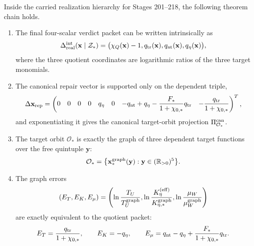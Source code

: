 \begin{theorem}
\label{thm:app-part06-main}
Inside the carried realization hierarchy for Stages 201--218, the following theorem chain holds.
\begin{enumerate}[leftmargin=2.2em]
  \item The final four-scalar verdict packet can be written intrinsically as
  \begin{equation}
  \label{eq:app-part06-main-intrinsic-packet}
  \Delta_{\rm real}^{\rm int}(\mathbf x\mid\mathcal Z_*)
  =
  \bigl(
  \chi_Q(\mathbf x)-1,
  q_{\rm tr}(\mathbf x),
  q_{\rm nt}(\mathbf x),
  q_\eta(\mathbf x)
  \bigr),
  \end{equation}
  where the three quotient coordinates are logarithmic ratios of the three target monomials.
  \item The canonical repair vector is supported only on the dependent triple,
  \begin{equation}
  \label{eq:app-part06-main-repair-vector}
  \Delta\mathbf x_{\rm rep}=
  \begin{pmatrix}
  0&0&0&0&q_\eta&0&-q_{\rm nt}+q_\eta-\dfrac{F_*}{1+\chi_{0,*}}q_{\rm tr}&-\dfrac{q_{\rm tr}}{1+\chi_{0,*}}
  \end{pmatrix}^{T},
  \end{equation}
  and exponentiating it gives the canonical target-orbit projection \(\Pi_{\mathcal O_*}^{\rm can}\).
  \item The target orbit \(\mathcal O_*\) is exactly the graph of three dependent target functions over the free quintuple \(\mathbf y\):
  \begin{equation}
  \label{eq:app-part06-main-target-graph}
  \mathcal O_*
  =
  \bigl\{\mathbf x_*^{\rm graph}(\mathbf y):\mathbf y\in(\mathbb R_{>0})^5\bigr\}.
  \end{equation}
  \item The graph errors
  \begin{equation}
  \label{eq:app-part06-main-graph-errors}
  (E_T,E_K,E_\mu)
  =
  \left(
  \ln\frac{T_U}{T_U^{\rm graph}},
  \ln\frac{K_\eta^{(\rm eff)}}{K_{\eta,*}^{\rm graph}},
  \ln\frac{\mu_W}{\mu_W^{\rm graph}}
  \right)
  \end{equation}
  are exactly equivalent to the quotient packet:
  \begin{equation}
  \label{eq:app-part06-main-graph-quotient}
  E_T=\frac{q_{\rm tr}}{1+\chi_{0,*}},
  \qquad
  E_K=-q_\eta,
  \qquad
  E_\mu=q_{\rm nt}-q_\eta+\frac{F_*}{1+\chi_{0,*}}q_{\rm tr}.

\end{equation}
\end{enumerate}
\end{theorem}
